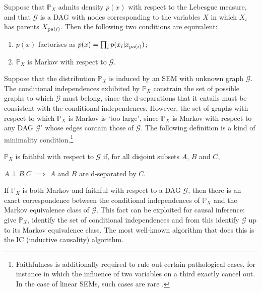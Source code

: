 \begin{theorem}\cite{lauritzen}
Suppose that $\mathbb{P}_X$ admits density $p(x)$ with respect to the Lebesgue measure, and that $\mathcal{G}$ is a DAG with nodes corresponding to the variables $X$ in which $X_i$ has parents $X_{\operatorname{pa}(i)}$. 
Then the following two conditions are equivalent:
\begin{enumerate}
\item $p(x)$ factorises as $p(x) = \prod_i p(x_i |x_{\operatorname{pa}(i)})$;
\item $\mathbb{P}_X$ is Markov with respect to $\mathcal{G}$.
\end{enumerate}
\end{theorem}
\medskip

Suppose that the distribution $\mathbb{P}_X$ is induced by an SEM with unknown graph $\mathcal{G}$.
The conditional independences exhibited by $\mathbb{P}_X$ constrain the set of possible graphs to which $\mathcal{G}$ must belong, since the d-separations that it entails must be consistent with the conditional independences.
However, the set of graphs with respect to which $\mathbb{P}_X$ is Markov is `too large', since $\mathbb{P}_X$ is Markov with respect to any DAG $\mathcal{G}'$ whose edges contain those of $\mathcal{G}$.
The following definition is a kind of minimality condition.\footnote{Faithfulness is additionally required to rule out certain pathological cases, for instance in which the influence of two variables on a third exactly cancel out. In the case of linear SEMs, such cases are rare \cite{lauritzen, see elem causality book ex. 6.34}.}
\\

\begin{definition}[Faithfulness]\cite{cite something?}
$\mathbb{P}_X$ is faithful with respect to $\mathcal{G}$ if, for all disjoint subsets
$A$, $B$ and $C$, 
\begin{center}
$A \perp B | C$ $\implies$ $A$ and $B$ are d-separated by $C$.
\end{center}
\end{definition}
\medskip

If $\mathbb{P}_X$ is both Markov and faithful with respect to a DAG $\mathcal{G}$, then there is an exact correspondence between the conditional independences of $\mathbb{P}_X$ and the Markov equivalence class of $\mathcal{G}$. 
This fact can be exploited for causal inference: give $\mathbb{P}_X$, identify the set of conditional independences and from this identify $\mathcal{G}$ up to its Markov equivalence class.
The most well-known algorithm that does this is the IC (inductive causality) algorithm.

